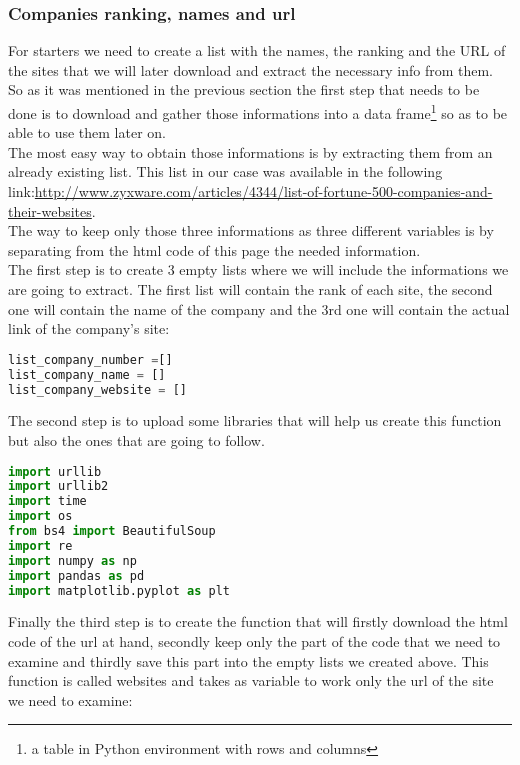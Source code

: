 \documentclass{article}
\begin{document}
\subsubsection{Companies ranking, names and url}
For starters we need to create a list with the names, the ranking and the URL of the sites that we will later download and extract the necessary info from them. So as it was mentioned in the previous section the first step that needs to be done is to download and gather those informations into a data frame\footnote{a table in Python environment with rows and columns} so as to be able to use them later on.\\
The most easy way to obtain those informations is by extracting them from an already existing list. This list in our case was available in the following link:\href{url}{http://www.zyxware.com/articles/4344/list-of-fortune-500-companies-and-their-websites}.\\
The way to keep only those three informations as three different variables is by separating from the html code of this page the needed information.\\
The first step is to create 3 empty lists where we will include the informations we are going to extract. The first list will contain the rank of each site, the second one will contain the name of the company and the 3rd one will contain the actual link of the company's site:
\begin{lstlisting}[language=Python]
list_company_number =[]
list_company_name = []
list_company_website = []
\end{lstlisting}
The second step is to upload some libraries that will help us create this function but also the ones that are going to follow.
\begin{lstlisting}[language=Python]
import urllib
import urllib2
import time
import os
from bs4 import BeautifulSoup
import re
import numpy as np
import pandas as pd
import matplotlib.pyplot as plt
\end{lstlisting}
Finally the third step is to create the function that will firstly download the html code of the url at hand, secondly keep only the part of the code that we need to examine and thirdly save this part into the empty lists we created above. This function is called websites and takes as variable to work only the url of the site we need to examine: 
\end{document}

